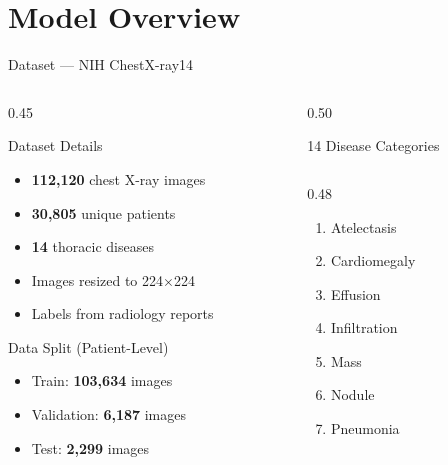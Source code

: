 \documentclass{beamer}
\begin{document}
\section{Model Overview}

\begin{frame}{Dataset --- NIH ChestX-ray14}
\begin{columns}[T]
\begin{column}{0.45\textwidth}
\begin{block}{Dataset Details}
\begin{itemize}
    \item \textbf{112,120} chest X-ray images
    \item \textbf{30,805} unique patients
    \item \textbf{14} thoracic diseases
    \item Images resized to 224$\times$224
    \item Labels from radiology reports
\end{itemize}
\end{block}
\vspace{4pt}
\begin{block}{Data Split (Patient-Level)}
\begin{itemize}
    \item Train: \textbf{103,634} images
    \item Validation: \textbf{6,187} images
    \item Test: \textbf{2,299} images
\end{itemize}
\end{block}
\end{column}
\begin{column}{0.50\textwidth}
\begin{block}{14 Disease Categories}
\footnotesize
\begin{columns}[T]
\begin{column}{0.48\textwidth}
\begin{enumerate}
    \item Atelectasis
    \item Cardiomegaly
    \item Effusion
    \item Infiltration
    \item Mass
    \item Nodule
    \item Pneumonia
\end{enumerate}

\end{column}
\end{columns}
\end{block}
\end{column}
\end{columns}
\end{frame}
\end{document}
